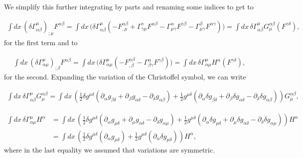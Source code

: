 \documentclass[aps,preprintnumbers,superscriptaddress,longbibliography]{revtex4-1}
\begin{document}
We simplify this further integrating by parts and renaming some indices to get to

\begin{eqnarray}
\int dx\, (\delta \Gamma^{\mu}_{\alpha \beta})_{;\mu}F^{\alpha \beta}=\int dx\, \big(\delta \Gamma^{\mu}_{\alpha \beta}(-F^{\alpha \beta}_{,\mu}+\Gamma^{\gamma}_{\gamma \mu} F^{\alpha \beta}- \Gamma^{\alpha}_{\mu \gamma}F^{\gamma \beta}- \Gamma^{\beta}_{\mu \gamma}F^{\alpha \gamma})\big)=\int dx\,\delta \Gamma^{\mu}_{\alpha \beta}G_{\mu}^{\alpha \beta}(F^{\gamma \delta}),    
\end{eqnarray}
for the first term and to

\begin{eqnarray}
\int dx\, (\delta \Gamma^{\mu}_{\alpha \mu})_{;\beta}F^{\alpha \beta}=\int dx\, \big(\delta \Gamma^{\mu}_{\alpha \mu}(-F^{\alpha \beta}_{,\beta}- \Gamma^{\alpha}_{\beta \gamma}F^{\gamma \beta})\big)=\int dx\, \delta \Gamma^{\mu}_{\alpha \mu}H^{\alpha}(F^{\gamma \delta}),     
\end{eqnarray}
for the second.
Expanding the variation of the Christoffel symbol, we can write

\begin{eqnarray}
\label{eq: eqvar8}
\int dx\, \delta \Gamma^{\mu}_{\alpha \beta}G^{\alpha \beta}_{\mu}=\int dx\, \left(\frac{1}{2}\delta g^{\mu \delta}(\partial_{\alpha}g_{\beta \delta}+\partial_{\beta}g_{\alpha \delta}-\partial_{\delta}g_{\alpha \beta})+\frac{1}{2} g^{\mu \delta}(\partial_{\alpha}\delta g_{\beta \delta}+\partial_{\beta}\delta g_{\alpha \delta}-\partial_{\delta}\delta g_{\alpha \beta})\right)G^{\alpha \beta}_{\mu},
\end{eqnarray}

\begin{equation}
\label{eq: eqvar9}
\begin{split}
\int dx\, \delta \Gamma^{\mu}_{\alpha \mu}H^{\alpha}& =\int dx\, \left(\frac{1}{2}\delta g^{\mu \delta}(\partial_{\alpha}g_{\mu \delta}+\partial_{\mu}g_{\alpha \delta}-\partial_{\delta}g_{\alpha \mu})+\frac{1}{2} g^{\mu \delta}(\partial_{\alpha}\delta g_{\mu \delta}+\partial_{\mu}\delta g_{\alpha \delta}-\partial_{\delta}\delta g_{\alpha \mu})\right)H^{\alpha}\\
&= \int dx\, \left(\frac{1}{2}\delta g^{\mu \delta}(\partial_{\alpha}g_{\mu \delta})+\frac{1}{2} g^{\mu \delta}(\partial_{\alpha}\delta g_{\mu \delta})\right)H^{\alpha},
\end{split}
\end{equation}
where in the last equality we assumed that variations are symmetric.
\end{document}
